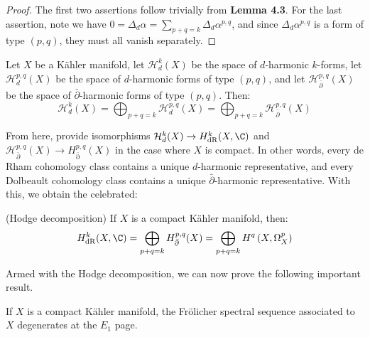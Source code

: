 \begin{proof}
    The first two assertions follow trivially from \textbf{Lemma 4.3}. For the last assertion, note we have $0 = \Delta_d\alpha = \sum_{p+q=k}\Delta_d\alpha^{p,q}$, and since $\Delta_d\alpha^{p,q}$ is a form of type $(p,q)$, they must all vanish separately.
\end{proof}

\begin{corollary}
    Let $X$ be a K\"ahler manifold, let $\mathcal{H}^k_d(X)$ be the space of $d$-harmonic $k$-forms, let $\mathcal{H}^{p,q}_d(X)$ be the space of $d$-harmonic forms of type $(p,q)$, and let $\mathcal{H}^{p,q}_{\bar\partial}(X)$ be the space of $\bar\partial$-harmonic forms of type $(p,q)$. Then:
    $$
    \mathcal{H}^{k}_d(X) = \bigoplus_{p+q=k}\mathcal{H}^{p,q}_{d}(X)=\bigoplus_{p+q=k}\mathcal{H}^{p,q}_{\bar\partial}(X)
    $$
\end{corollary}

\noindent From here, \cite[Theorems 5.23, 5.24]{VoisinI2002} provide isomorphisms $\mathcal{H}^k_d(X) \to H^k_\mathrm{dR}(X,\C)$ and $\mathcal{H}^{p,q}_{\bar\partial}(X) \to H^{p,q}_\mathrm{\bar\partial}(X)$ in the case where $X$ is compact. In other words, every de Rham cohomology class contains a unique $d$-harmonic representative, and every Dolbeault cohomology class contains a unique $\bar\partial$-harmonic representative. With this, we obtain the celebrated:
\begin{theorem}
    (Hodge decomposition) If $X$ is a compact K\"ahler manifold, then:
    $$
    H^k_\mathrm{dR}(X,\C) = \bigoplus_{p+q=k} H^{p,q}_{\bar\partial} (X) = \bigoplus_{p+q=k} H^q\left(X,\Omega_X^p\right)
    $$
\end{theorem}

\noindent Armed with the Hodge decomposition, we can now prove the following important result. 
\begin{theorem}
    If $X$ is a compact K\"ahler manifold, the Fr\"olicher spectral sequence associated to $X$ degenerates at the $E_1$ page. 
\end{theorem}

